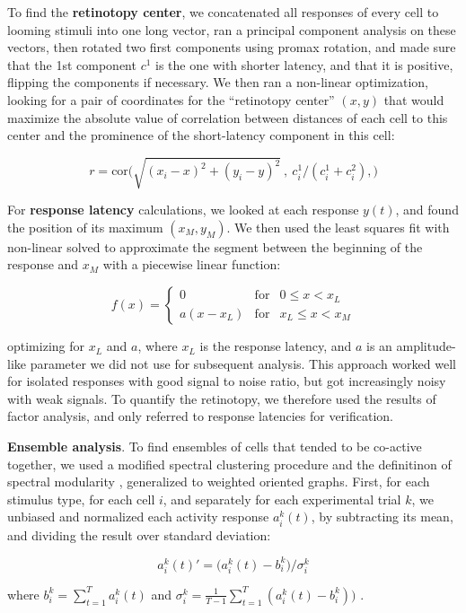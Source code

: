 \documentclass{article}
\begin{document}
To find the \textbf{retinotopy center}, we concatenated all responses of every cell to looming stimuli into one long vector, ran a principal component analysis on these vectors, then rotated two first components using promax rotation, and made sure that the 1st component $c^1$ is the one with shorter latency, and that it is positive, flipping the components if necessary. We then ran a non-linear optimization, looking for a pair of coordinates for the “retinotopy center” $(x,y)$ that would maximize the absolute value of correlation between distances of each cell to this center and the prominence of the short-latency component in this cell:

\[ r = \text{cor}\big(\sqrt{(x_i-x)^2+(y_i-y)^2}\ ,\ c^1_i/(c^1_i + c^2_i), \big) \]

For \textbf{response latency} calculations, we looked at each response $y(t)$, and found the position of its maximum $(x_M, y_M)$. We then used the least squares fit with non-linear solved to approximate the segment between the beginning of the response and $x_M$ with a piecewise linear function:

\[ f(x) = \left \{ \begin{array}{cll} 0 & \text{for} & 0 \leqslant x<x_L \\
a (x-x_L) & \text{for} & x_L\leqslant x < x_M \end{array} \right. \]

optimizing for $x_L$ and $a$, where $x_L$ is the response latency, and $a$ is an amplitude-like parameter we did not use for subsequent analysis. This approach worked well for isolated responses with good signal to noise ratio, but got increasingly noisy with weak signals. To quantify the retinotopy, we therefore used the results of factor analysis, and only referred to response latencies for verification.

\textbf{Ensemble analysis}. To find ensembles of cells that tended to be co-active together, we used a modified spectral clustering procedure \citep{ng2002spectral} and the definitinon of spectral modularity \citep{newman2006modularity}, generalized to weighted oriented graphs. First, for each stimulus type, for each cell $i$, and separately for each experimental trial $k$, we unbiased and normalized each activity response $a^k_i(t)$, by subtracting its mean, and dividing the result over standard deviation:

\[ a^k_i(t)' = \big(a^k_i(t)-b^k_i\big)/\sigma^k_i \]

where $b^k_i = \sum_{t=1}^T{a^k_i(t)}$ and $\sigma^k_i = \frac{1}{T-1}\sum_{t=1}^T{(a^k_i(t) - b^k_i))}$ .
\end{document}
